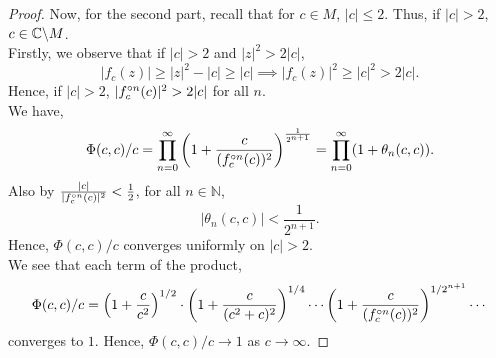 \begin{proof}
Now, for the second part, recall that for \( c\in M \), \( |c|\le 2 \). Thus,
if \( |c|>2 \), \( c\in \mathbb{C}\backslash M \).\\
Firstly, we observe that if \( |c|>2 \) and \( |z|^2>2|c| \), \[ |f_c(z)|\ge |z|^2-|c|\ge |c| \implies|f_c(z)|^2\ge |c|^2>2|c|.\]
Hence, if \( |c|>2 \), \( |\fcof[n](c)|^2>2|c| \) for all \( n \).\\
We have, \[
	\Phi(c,c)/c=\prod_{n=0}^\infty \left( 1+ \frac{c}{(\fcof[n](c))^2} \right)^{\frac{1}{2^{n+1}}}=\prod_{n=0}^\infty(1+\theta_n(c,c))
.\] 
Also by \( \frac{|c|}{|\fcof[n](c)|^2}<\frac{1}{2} \), for all \( n \in \mathbb{N} \), \[
	|\theta_n(c,c)|<\frac{1}{2^{n+1}}
.\] 
Hence, \( \Phi(c,c) /c \) converges uniformly on \( |c|>2 \). \\
We see that each term of the product, \[
	\Phi(c,c) /c=\left(1+\frac{c}{c^2}\right)^{1/2}\cdot\left(1+\frac{c}{(c^2+c)^2}\right)^{1/4}\cdots\left(1+\frac{c}{(\fcof[n](c))^2}\right)^{1/2^{n+1}}\cdots
\] 
converges to \( 1 \). Hence, \( \Phi(c,c) /c\to 1 \) as \( c\to \infty \).
\end{proof}

